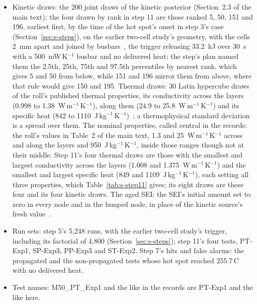 \documentclass[preprint,12pt]{elsarticle}
\newcommand{\degC}{\,\textdegree C}
\begin{document}
\begin{itemize}
\item Kinetic draws: the 200 joint draws of the kinetic posterior (Section~2.3 of the main text); the four drawn by rank in step 11 are those ranked 5, 50, 151 and 196, earliest first, by the time of the hot spot's onset in step 3's case (Section~\ref{sec:s-steps}), on the earlier two-cell study's geometry, with the cells 2~mm apart and joined by busbars~\cite{satte2026twocell}, the trigger releasing 33.2~kJ over 30~s with a 500~mW\,K$^{-1}$ busbar and no delivered heat; the step's plan named them the 2.5th, 25th, 75th and 97.5th percentiles by nearest rank, which gives 5 and 50 from below, while 151 and 196 mirror them from above, where that rule would give 150 and 195. Thermal draws: 30 Latin hypercube draws of the roll's published thermal properties, its conductivity across the layers (0.998 to 1.38~W\,m$^{-1}$\,K$^{-1}$), along them (24.9 to 25.8~W\,m$^{-1}$\,K$^{-1}$) and its specific heat (842 to 1110~J\,kg$^{-1}$\,K$^{-1}$)~\cite{oregan2022thermal,chen2021simplified}; a thermophysical standard deviation is a spread over them. The nominal properties, called central in the records: the roll's values in Table~2 of the main text, 1.3 and 25~W\,m$^{-1}$\,K$^{-1}$ across and along the layers and 950~J\,kg$^{-1}$\,K$^{-1}$, inside those ranges though not at their middle. Step 11's four thermal draws are those with the smallest and largest conductivity across the layers (1.008 and 1.375~W\,m$^{-1}$\,K$^{-1}$) and the smallest and largest specific heat (849 and 1109~J\,kg$^{-1}$\,K$^{-1}$), each setting all three properties, which Table~\ref{tab:s-step11} gives; its eight draws are these four and its four kinetic draws. The aged SEI: the SEI's initial amount set to zero in every node and in the lumped node, in place of the kinetic source's fresh value~\cite{koenig2025uncertainty}.
\item Run sets: step 5's 5,248 runs, with the earlier two-cell study's trigger, including its factorial of 4,800 (Section~\ref{sec:s-steps}); step 11's four tests, PT-Exp1, SP-Exp3, PP-Exp3 and ST-Exp2. Step 7's hits and false alarms: the propagated and the non-propagated tests whose hot spot reached 255.7\degC{} with no delivered heat.
\item Test names: M50\_PT\_Exp1 and the like in the records are PT-Exp1 and the like here.

\end{itemize}
\end{document}
